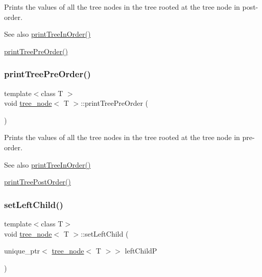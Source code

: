 Prints the values of all the tree nodes in the tree rooted at the tree node in post-\/order. \begin{DoxySeeAlso}{See also}
\hyperlink{classtree__node_ae87818a195621d4defc1cde67e7219ee}{print\+Tree\+In\+Order()} 

\hyperlink{classtree__node_a2ca4e1521e6620bbe2418a9636a109a8}{print\+Tree\+Pre\+Order()} 
\end{DoxySeeAlso}
\mbox{\label{classtree__node_a2ca4e1521e6620bbe2418a9636a109a8}} 
\subsubsection{\texorpdfstring{print\+Tree\+Pre\+Order()}{printTreePreOrder()}}
{\footnotesize\ttfamily template$<$class T $>$ \\
void \hyperlink{classtree__node}{tree\+\_\+node}$<$ T $>$\+::print\+Tree\+Pre\+Order (\begin{DoxyParamCaption}{ }\end{DoxyParamCaption})}

Prints the values of all the tree nodes in the tree rooted at the tree node in pre-\/order. \begin{DoxySeeAlso}{See also}
\hyperlink{classtree__node_ae87818a195621d4defc1cde67e7219ee}{print\+Tree\+In\+Order()} 

\hyperlink{classtree__node_a4bfdd2b618c15252fcfbeab46ca05861}{print\+Tree\+Post\+Order()} 
\end{DoxySeeAlso}
\mbox{\label{classtree__node_a3db979969a0fe8505ba65c7afabb5463}} 
\subsubsection{\texorpdfstring{set\+Left\+Child()}{setLeftChild()}}
{\footnotesize\ttfamily template$<$class T$>$ \\
void \hyperlink{classtree__node}{tree\+\_\+node}$<$ T $>$\+::set\+Left\+Child (\begin{DoxyParamCaption}\item[{unique\+\_\+ptr$<$ \hyperlink{classtree__node}{tree\+\_\+node}$<$ T $>$$>$}]{left\+ChildP }\end{DoxyParamCaption})\hspace{0.3cm}{\ttfamily [inline]}}

